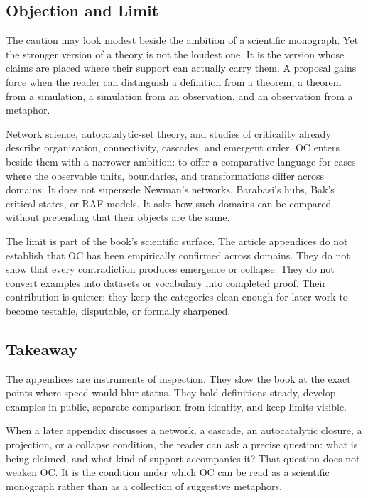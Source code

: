 \documentclass[11pt,a4paper,openany]{book}
\begin{document}
\subsection{Objection and Limit}
The caution may look modest beside the ambition of a scientific monograph. Yet the stronger version of a theory is not the loudest one. It is the version whose claims are placed where their support can actually carry them. A proposal gains force when the reader can distinguish a definition from a theorem, a theorem from a simulation, a simulation from an observation, and an observation from a metaphor. \cite{raf_networks,bak_soc}\par
Network science, autocatalytic-set theory, and studies of criticality already describe organization, connectivity, cascades, and emergent order. OC enters beside them with a narrower ambition: to offer a comparative language for cases where the observable units, boundaries, and transformations differ across domains. It does not supersede Newman's networks, Barabasi's hubs, Bak's critical states, or RAF models. It asks how such domains can be compared without pretending that their objects are the same.\par
The limit is part of the book's scientific surface. The article appendices do not establish that OC has been empirically confirmed across domains. They do not show that every contradiction produces emergence or collapse. They do not convert examples into datasets or vocabulary into completed proof. Their contribution is quieter: they keep the categories clean enough for later work to become testable, disputable, or formally sharpened.\par
\subsection{Takeaway}
The appendices are instruments of inspection. They slow the book at the exact points where speed would blur status. They hold definitions steady, develop examples in public, separate comparison from identity, and keep limits visible. \cite{raf_networks,bak_soc}\par
When a later appendix discusses a network, a cascade, an autocatalytic closure, a projection, or a collapse condition, the reader can ask a precise question: what is being claimed, and what kind of support accompanies it? That question does not weaken OC. It is the condition under which OC can be read as a scientific monograph rather than as a collection of suggestive metaphors.\par
\clearpage
\nocite{*}
\printbibliography[heading=bibintoc,title={Bibliography}]
\end{document}
